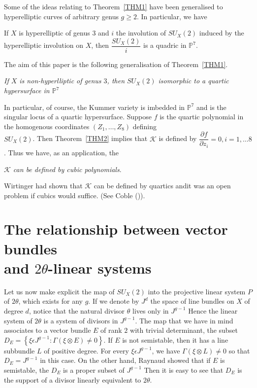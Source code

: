 Some of the ideas relating to Theorem~\ref{THM1} have been
generalised \cite{key2} to hyperelliptic curves of arbitrary genus
$g\geq 2$. In particular, we have 

\begin{THM}\label{THM3}
If $X$ is hyperelliptic of genus $3$ and $i$ the involution of
$SU_X(2)$ induced by the hyperelliptic involution on $X$, then
$\dfrac{SU_X(2)}{i}$ is a quadric in $\mathbb{P}^{7}$. 
\end{THM}

The aim of this paper is the following generalisation of
Theorem~\ref{THM1}.

\begin{MT}
\textit{If $X$ is non-hyperlliptic of genus $3$, then $SU_X(2)$
  isomorphic to a quartic hypersurface in $\mathbb{P}^{7}$}
\end{MT}

In particular, of course, the Kummer variety is imbedded in
$\mathbb{P}^{7}$  and is the singular locus of a quartic
hypersurface. Suppose $f$ is the quartic polynomial in the homogenous
coordinates $(Z_1,\ldots,Z_8)$ defining\\ $SU_X(2)$. Then
Theorem~\ref{THM2} implies that $\mathscr{K}$ is defined by
$\dfrac{\partial f}{\partial z_{i}}=0,i=1,\ldots 8$. Thus we have, as
an application, the 

\begin{corr}
\textit{$\mathscr{K}$ can be defined by cubic polynomials}.
\end{corr}

Wirtinger \cite{key7} had shown that $\mathscr{K}$ can be defined by
quartics and\pageoriginale it was an open problem if cubics would suffice. (See
Coble (\cite[p. 106]{key1})). 

\section[The relationship between vector bundles......]{The relationship between vector bundles\\ and \texorpdfstring{$2\theta$}{eq}-linear
  systems}\label{s2}

Let us now make explicit the map of $SU_X(2)$ into the projective
linear system $P$ of $2\theta$, which exists for any $g$. If we denote
by $J^{d}$ the space of line bundles on $X$ of degree $d$, notice that
the natural divisor $\theta$ lives only in $J^{g-1}$ Hence the linear
system of $2\theta$ is a system of divisors in $J^{g-1}$. The map that
we have in mind associates to a vector bundle $E$ of rank $2$ with
trivial determinant, the subset $D_E=\left\{\xi \epsilon J^{g-1}:\Gamma
(\xi \otimes E)\neq 0\right\}$. If $E$ is not semistable, then it has a line
subbundle $L$ of positive degree. For every $\xi \epsilon J^{g-1}$,  we
have $\Gamma(\xi \otimes L)\neq 0$ so that $D_E=J^{g-1}$ in this
case. On the other hand, Raynaud \cite{key6} showed that if $E$ is
semistable, the $D_E$ is a proper subset of $J^{g-1}$ Then it is easy
to see that $D_E$ is the support of a divisor linearly equivalent to
$2\theta$. 

